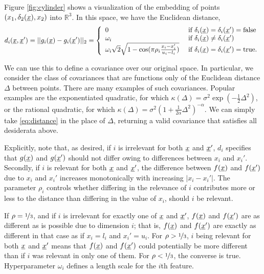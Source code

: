 \documentclass{article}
\newcommand{\vect}[1]{\underline{\smash{#1}}}
\renewcommand{\v}[1]{\vect{#1}}
\newcommand{\reals}{\mathds{R}}
\newcommand{\br}{}%
\newcommand{\note}[1]{}
\newcommand{\embeddingletter}{g}
\begin{document}
Figure \ref{fig:cylinder} shows a visualization of the embedding of points $(x_1, \delta_2(\v{x}), x_2)$ into $\reals^3$. 
%
In this space, we have the Euclidean distance,
%
\begin{equation}
d\br_i(\v{x}, \v{x}') = ||\embeddingletter_i\br(\v{x})-\embeddingletter_i\br(\v{x}')||_2 =\left\{\begin{array}{ll}
0 & \textrm{ if } \delta_i(\v{x}) = \delta_i(\v{x}') = \textrm{false}\\
\omega_i & \textrm{ if } \delta_i(\v{x}) \neq \delta_i(\v{x}')\\
\omega_i \sqrt{2} \sqrt{1 - \cos(\pi\rho_i \frac{x_i-x_i'}{u_i-l_i})} & \textrm{ if } \delta_i(\v{x}) = \delta_i(\v{x}') = \textrm{true}. \end{array}\right.
\label{eq:distance}
\end{equation}



We can use this to define a covariance over our original space. In particular, we consider the class of covariances that are functions only of the Euclidean distance $\Delta$ between points. There are many examples of such covariances. Popular examples are the exponentiated quadratic, for which $\kappa(\Delta) = \sigma^2 \exp(-\frac{1}{2} \Delta^2)$, or the rational quadratic, for which $\kappa(\Delta) = \sigma^2 (1+\frac{1}{2\alpha} \Delta^2)^{-\alpha}$. We can simply take \eqref{eq:distance} in the place of $\Delta$, returning a valid covariance that satisfies all desiderata above. 


Explicitly, note that, as desired, if $i$ is irrelevant for both $\v{x}$ and $\v{x}'$, $d\br_i$ specifies that $g(\v{x})$ and $g(\v{x}')$ should not differ owing to differences between $x_i$ and $x_i'$. Secondly, if $i$ is relevant for both $\v{x}$ and $\v{x}'$, the difference between $f(\v{x})$ and $f(\v{x}')$ due to $x_i$ and $x_i'$ increases monotonically with increasing $\left|x_i-x_i'\right|$. The parameter $\rho_i$ controls whether differing in the relevance of $i$ contributes more or less to the distance than differing in the value of $x_i$, should $i$ be relevant. 
%
%
\note{FH: the following 3 sentences are details that could be dropped if we're in need of space.}
If $\rho = \nicefrac{1}{3}$, and if $i$ is irrelevant for exactly one of $\v{x}$ and $\v{x}'$, $f(\v{x})$ and $f(\v{x}')$ are as different as is possible due to dimension $i$; that is, $f(\v{x})$ and $f(\v{x}')$ are exactly as different in that case as if $x_i=l_i$ and $x_i'=u_i$. For $\rho>\nicefrac{1}{3}$, $i$ being relevant for both $\v{x}$ and $\v{x}'$ means that $f(\v{x})$ and $f(\v{x}')$ could potentially be more different than if
$i$ was relevant in only one of them. For $\rho<\nicefrac{1}{3}$, the converse is true. 
%
%
Hyperparameter $\omega_i$ defines a length scale for the $i$th feature. 
\end{document}
